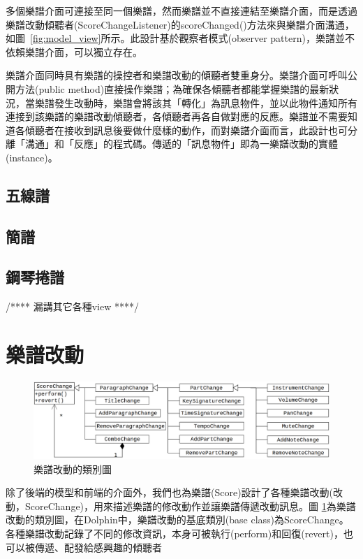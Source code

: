 \documentclass[12pt,a4paper,oneside]{report}
\begin{document}
多個樂譜介面可連接至同一個樂譜，然而樂譜並不直接連結至樂譜介面，而是透過樂譜改動傾聽者(ScoreChangeListener)的scoreChanged()方法來與樂譜介面溝通，如圖~\ref{fig:model_view}所示。此設計基於觀察者模式(observer pattern)\cite{designPattern}，樂譜並不依賴樂譜介面，可以獨立存在。

樂譜介面同時具有樂譜的操控者和樂譜改動的傾聽者雙重身分。樂譜介面可呼叫公開方法(public method)直接操作樂譜；為確保各傾聽者都能掌握樂譜的最新狀況，當樂譜發生改動時，樂譜會將該其「轉化」為訊息物件，並以此物件通知所有連接到該樂譜的樂譜改動傾聽者，各傾聽者再各自做對應的反應。樂譜並不需要知道各傾聽者在接收到訊息後要做什麼樣的動作，而對樂譜介面而言，此設計也可分離「溝通」和「反應」的程式碼。傳遞的「訊息物件」即為一樂譜改動的實體(instance)。

\subsection{五線譜}
\subsection{簡譜}
\subsection{鋼琴捲譜}
/****
漏講其它各種view
****/

\section{樂譜改動}

\begin{figure}[htb]
\centering
\includegraphics[scale=0.1]{img/changes.png}
\caption{ 樂譜改動的類別圖 }
\label{fig:changes}
\end{figure}


除了後端的模型和前端的介面外，我們也為樂譜(Score)設計了各種樂譜改動(改動，ScoreChange)，用來描述樂譜的修改動作並讓樂譜傳遞改動訊息。圖 \ref{fig:changes}為樂譜改動的類別圖，在Dolphin中，樂譜改動的基底類別(base class)為ScoreChange。各種樂譜改動記錄了不同的修改資訊，本身可被執行(perform)和回復(revert)，也可以被傳遞、配發給感興趣的傾聽者
\end{document}
